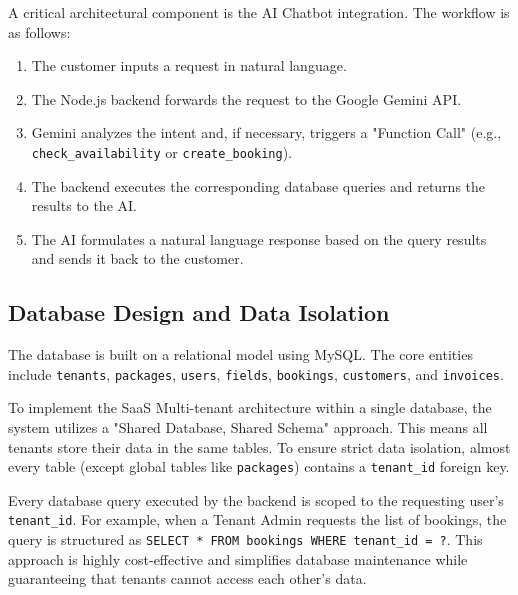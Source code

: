 A critical architectural component is the AI Chatbot integration. The workflow is as follows:
\begin{enumerate}
    \item The customer inputs a request in natural language.
    \item The Node.js backend forwards the request to the Google Gemini API.
    \item Gemini analyzes the intent and, if necessary, triggers a "Function Call" (e.g., \texttt{check\_availability} or \texttt{create\_booking}).
    \item The backend executes the corresponding database queries and returns the results to the AI.
    \item The AI formulates a natural language response based on the query results and sends it back to the customer.
\end{enumerate}

\subsection{Database Design and Data Isolation}

The database is built on a relational model using MySQL. The core entities include \texttt{tenants}, \texttt{packages}, \texttt{users}, \texttt{fields}, \texttt{bookings}, \texttt{customers}, and \texttt{invoices}.

To implement the SaaS Multi-tenant architecture within a single database, the system utilizes a "Shared Database, Shared Schema" approach. This means all tenants store their data in the same tables. To ensure strict data isolation, almost every table (except global tables like \texttt{packages}) contains a \texttt{tenant\_id} foreign key. 

Every database query executed by the backend is scoped to the requesting user's \texttt{tenant\_id}. For example, when a Tenant Admin requests the list of bookings, the query is structured as \texttt{SELECT * FROM bookings WHERE tenant\_id = ?}. This approach is highly cost-effective and simplifies database maintenance while guaranteeing that tenants cannot access each other's data.